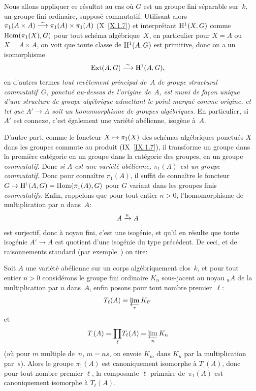 Nous allons appliquer ce r\'esultat au cas o\`u $G$ est un groupe
fini s\'eparable sur~$k$, \ie un groupe fini ordinaire, suppos\'e
commutatif. Utilisant alors $\pi_1(A\times A)\overset{\sim}{\longrightarrow} \pi_1(A)\times
\pi_1(A)$ (X~\ref{X.1.7}) et interpr\'etant $\mathrm{H}^1(X,G)$ comme
$\operatorname{Hom}(\pi_1(X),G)$ pour tout sch\'ema alg\'ebrique~$X$, en
particulier pour $X=A$ ou $X=A\times A$, on voit que toute classe de
$\mathrm{H}^1(A,G)$ est primitive, donc on a un isomorphisme
$$
\operatorname{Ext}(A,G)\overset{\sim}{\longrightarrow} \mathrm{H}^1(A,G),
$$
en d'autres termes \emph{tout revêtement principal de~$A$ de
groupe structural commutatif~$G$, ponctué au-dessus de l'origine
de~$A$, est muni de fa\c con unique d'une structure de groupe
algébrique admettant le point marqué comme origine, et tel que
$A'\to A$ soit un homomorphisme de groupes algébriques.} En
particulier, si $A'$ est connexe, c'est \'egalement une
vari\'et\'e ab\'elienne, isog\`ene \`a~$A$.

D'autre part, comme le foncteur $X\mto \pi_1(X)$ des sch\'emas
alg\'ebriques ponctu\'es $X$ dans les groupes commute au produit
(IX~\ref{IX.1.7}), il transforme un groupe dans la premi\`ere
cat\'egorie en un groupe dans la cat\'egorie des groupes, \ie en
un groupe \emph{commutatif}. Donc \emph{si $A$ est une variété
abélienne, $\pi_1(A)$
est un groupe commutatif.} Donc pour conna\^itre $\pi_1(A)$, il
suffit de conna\^itre le foncteur $G\mto
\H^1(A,G)=\Hom(\pi_1(A),G)$ pour $G$ variant dans les groupes finis
\emph{commutatifs}. Enfin, rappelons que pour tout entier $n>0$,
l'homomorphisme de multiplication par $n$ dans~$A$:
$$
A\xrightarrow{n} A
$$
est surjectif, donc \`a noyau fini, \ie c'est une isog\'enie, et
qu'il en r\'esulte que toute isog\'enie $A'\to A$ est quotient
d'une isog\'enie du type pr\'ec\'edent. De ceci, et de
raisonnements standard (\cf par exemple~\cite{XI.6}) on tire:

\begin{theoreme}
\label{XI.2.1}
Soit $A$ une vari\'et\'e ab\'elienne sur un corps
alg\'ebriquement clos~$k$, et pour tout entier $n>0$ consid\'erons
le groupe fini ordinaire $K_n$ sous-jacent au noyau ${}_nA$ de la
multiplication par $n$ dans~$A$, enfin posons pour tout nombre
premier~$\ell$:
$$
T_\ell(A)=\varprojlim_r K_{\ell^r}
$$
et
$$
T_{.}(A)=\underset{\ell}{\prod}T_\ell(A)=\varprojlim_n K_n
$$
(o\`u pour $m$ multiple de~$n$, $m=ns$, on envoie $K_m$ dans $K_n$
par la multiplication par~$s$). Alors le groupe $\pi_1(A)$ est
canoniquement isomorphe \`a $T_{.}(A)$, donc pour tout nombre
premier $\ell$, la composante $\ell$-primaire de~$\pi_1(A)$ est
canoniquement isomorphe \`a $T_\ell(A)$.
\end{theoreme}


